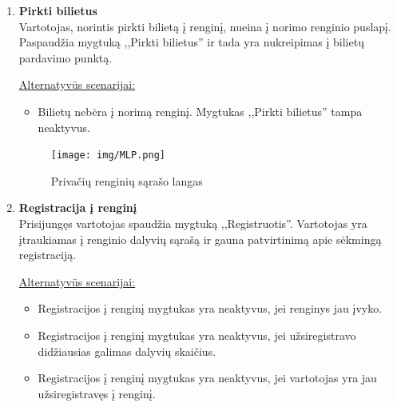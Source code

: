 \documentclass{VUMIFPSkursinis}
\begin{document}
\begin{enumerate} [label = \textbf{U\arabic*.}]
				\underline{Alternatyvūs scenarijai:}
				\begin{itemize}
						\item Vartotojui įvedus neteisingą prisijungimo informaciją ar neužpildžius, kurio nors prisijungimo laukelio, sistema paprašo dar kartą įvesti duomenis.
				\end{itemize}

				\begin{figure}[H]
					\centering
					\texttt{[image: img/MLP.png]}
					\caption{Renginio organizatoriaus informacijos patikrinimo langas}
					\label{fig:patikrinti-renginio-organizatoriaus-informacija}
				\end{figure}
			
			\item \textbf{Pirkti bilietus} \\
				Vartotojas, norintis pirkti bilietą į renginį, nueina į norimo renginio puslapį. Paspaudžia mygtuką ,,Pirkti bilietus'' ir tada yra nukreipimas į bilietų pardavimo punktą.
				
				\underline{Alternatyvūs scenarijai:}
				\begin{itemize}
				\item Bilietų nebėra į norimą renginį. Mygtukas ,,Pirkti bilietus'' tampa neaktyvus.
				\end{itemize}
			
				\begin{figure}[H]
					\centering
					\texttt{[image: img/MLP.png]}
					\caption{Privačių renginių sąrašo langas}
					\label{fig:matyti-privacius-renginius}
				\end{figure}
				
			\item \textbf{Registracija į renginį} \\
					Prisijungęs vartotojas spaudžia mygtuką ,,Registruotis''. Vartotojas yra įtraukiamas į renginio dalyvių sąrašą ir gauna patvirtinimą apie sėkmingą registraciją.
					
				\underline{Alternatyvūs scenarijai:}
				\begin{itemize}
						\item Registracijos į renginį mygtukas yra neaktyvus, jei renginys jau įvyko.
						\item Registracijos į renginį mygtukas yra neaktyvus, jei užsiregistravo didžiausias galimas dalyvių skaičius.
						\item Registracijos į renginį mygtukas yra neaktyvus, jei vartotojas yra jau užsiregistravęs į renginį.
				\end{itemize}


\end{enumerate}
\end{document}
